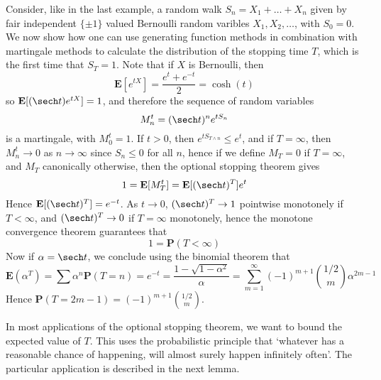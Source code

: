\begin{example}
    Consider, like in the last example, a random walk $S_n = X_1 + \dots + X_n$ given by fair independent $\{ \pm 1 \}$ valued Bernoulli random varibles $X_1, X_2, \dots$, with $S_0 = 0$. We now show how one can use generating function methods in combination with martingale methods to calculate the distribution of the stopping time $T$, which is the first time that $S_T = 1$. Note that if $X$ is Bernoulli, then
    \[ \mathbf{E}[e^{tX}] = \frac{e^t + e^{-t}}{2} = \cosh(t) \]
    so $\mathbf{E}[(\sech t) e^{tX}] = 1$, and therefore the sequence of random variables
    \[ M_n^t = (\sech t)^n e^{tS_n} \]
    is a martingale, with $M_0^t = 1$. If $t > 0$, then $e^{tS_{T \wedge n}} \leq e^t$, and if $T = \infty$, then $M_n^t \to 0$ as $n \to \infty$ since $S_n \leq 0$ for all $n$, hence if we define $M_T = 0$ if $T = \infty$, and $M_T$ canonically otherwise, then the optional stopping theorem gives
    \[ 1 = \mathbf{E}[M_T^t] = \mathbf{E}[(\sech t)^T] e^t \]
    Hence $\mathbf{E}[(\sech t)^T] = e^{-t}$. As $t \to 0$, $(\sech t)^T \to 1$ pointwise monotonely if $T < \infty$, and $(\sech t)^T \to 0$ if $T = \infty$ monotonely, hence the monotone convergence theorem guarantees that
    \[ 1 = \mathbf{P}(T < \infty) \]
    Now if $\alpha = \sech t$, we conclude using the binomial theorem that
    \[ \mathbf{E}(\alpha^T) = \sum \alpha^n \mathbf{P}(T = n) = e^{-t} = \frac{1 - \sqrt{1 - \alpha^2}}{\alpha} = \sum_{m = 1}^\infty (-1)^{m+1} {1/2 \choose m} \alpha^{2m-1} \]
    Hence $\mathbf{P}(T = 2m - 1) = (-1)^{m+1} {1/2 \choose m}$.
\end{example}

In most applications of the optional stopping theorem, we want to bound the expected value of $T$. This uses the probabilistic principle that `whatever has a reasonable chance of happening, will almost surely happen infinitely often'. The particular application is described in the next lemma.

